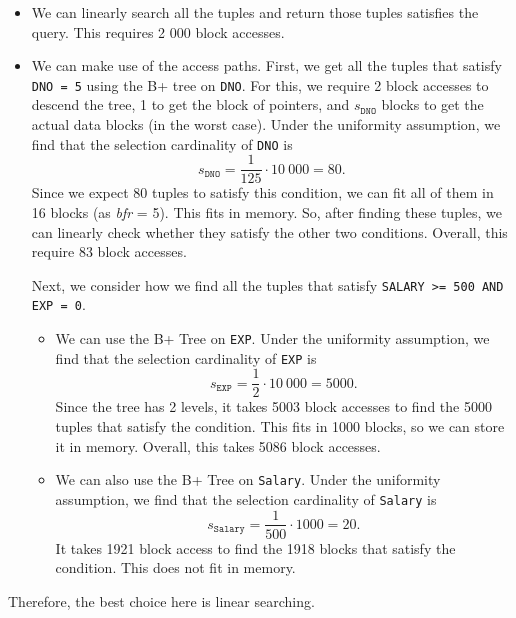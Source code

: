 \documentclass[a4paper, openany]{memoir}
\theoremstyle{definition}
\begin{document}
\begin{answer}
    \begin{itemize}
        \item We can linearly search all the tuples and return those tuples satisfies the query. This requires 2 000 block accesses.
        
        \item We can make use of the access paths. First, we get all the tuples that satisfy \texttt{DNO = 5} using the B+ tree on \texttt{DNO}. For this, we require 2 block accesses to descend the tree, 1 to get the block of pointers, and $s_{\texttt{DNO}}$ blocks to get the actual data blocks (in the worst case). Under the uniformity assumption, we find that the selection cardinality of \texttt{DNO} is 
        \[s_{\texttt{DNO}} = \frac{1}{125} \cdot 10 \ 000 = 80.\]
        Since we expect 80 tuples to satisfy this condition, we can fit all of them in 16 blocks (as \textit{bfr} = 5). This fits in memory. So, after finding these tuples, we can linearly check whether they satisfy the other two conditions. Overall, this require 83 block accesses.

        Next, we consider how we find all the tuples that satisfy \texttt{SALARY >= 500 AND EXP = 0}.
        \begin{itemize}
            \item We can use the B+ Tree on \texttt{EXP}. Under the uniformity assumption, we find that the selection cardinality of \texttt{EXP} is
            \[s_{\texttt{EXP}} = \frac{1}{2} \cdot 10 \ 000 = 5000.\]
            Since the tree has 2 levels, it takes 5003 block accesses to find the 5000 tuples that satisfy the condition. This fits in 1000 blocks, so we can store it in memory. Overall, this takes 5086 block accesses.

            \item We can also use the B+ Tree on \texttt{Salary}. Under the uniformity assumption, we find that the selection cardinality of \texttt{Salary} is
            \[s_{\texttt{Salary}} = \frac{1}{500} \cdot 1000 = 20.\]
            It takes 1921 block access to find the 1918 blocks that satisfy the condition. This does not fit in memory. 
        \end{itemize}
    \end{itemize}
    Therefore, the best choice here is linear searching. 
\end{answer}
\end{document}

